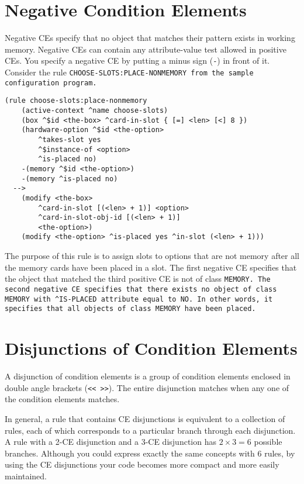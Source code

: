 \section{Negative Condition Elements}

Negative CEs specify that no object that matches their pattern exists
in working memory. Negative CEs can contain any attribute-value test
allowed in positive CEs. You specify a negative CE by putting a minus
sign (\verb|-|) in front of it. Consider the rule
\tt{CHOOSE-SLOTS:PLACE-NONMEMORY} from the sample configuration
program.

\begin{exampl}
\begin{verbatim}
(rule choose-slots:place-nonmemory
    (active-context ^name choose-slots)
    (box ^$id <the-box> ^card-in-slot { [=] <len> [<] 8 })
    (hardware-option ^$id <the-option>
        ^takes-slot yes
        ^$instance-of <option>
        ^is-placed no)
    -(memory ^$id <the-option>)
    -(memory ^is-placed no)
  -->
    (modify <the-box>
        ^card-in-slot [(<len> + 1)] <option>
        ^card-in-slot-obj-id [(<len> + 1)]
        <the-option>)
    (modify <the-option> ^is-placed yes ^in-slot (<len> + 1)))
\end{verbatim}
\end{exampl}

The purpose of this rule is to assign slots to options that are not
memory after all the memory cards have been placed in a slot. The
first negative CE specifies that the object that matched the third
positive CE is not of class \tt{MEMORY}. The second negative CE
specifies that there exists no object of class \tt{MEMORY} with
\verb|^IS-PLACED| attribute equal to \tt{NO}. In other words, it
specifies that all objects of class \tt{MEMORY} have been placed.

\section{Disjunctions of Condition Elements}

A disjunction of condition elements is a group of condition elements
enclosed in double angle brackets (\verb|<< >>|). The entire
disjunction matches when any one of the condition elements matches.

In general, a rule that contains CE disjunctions is equivalent to a
collection of rules, each of which corresponds to a particular branch
through each disjunction. A rule with a 2-CE disjunction and a 3-CE
disjunction has $2 \times 3 = 6$ possible branches. Although you could
express exactly the same concepts with 6 rules, by using the CE
disjunctions your code becomes more compact and more easily
maintained.

